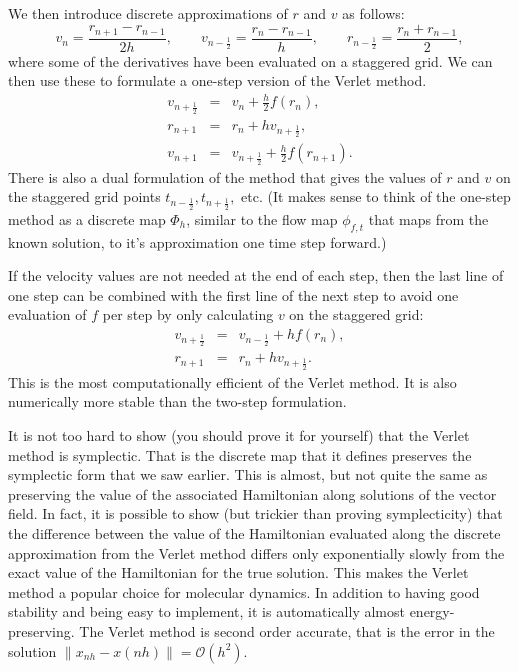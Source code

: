 \documentclass{article}
\begin{document}
We then introduce discrete approximations of $r$ and $v$ as follows:
$$
v_n =\frac{r_{n+1}-r_{n-1}}{2h},\qquad v_{n-\frac12} = \frac{r_n-r_{n-1}}{h}, \qquad r_{n-\frac12} = \frac{r_n + r_{n-1}}{2},
$$
where some of the derivatives have been evaluated on a staggered grid. We can then use these to formulate a one-step version of the Verlet method. 
\begin{eqnarray*}
	v_{n+\frac12} &=& v_n+\frac{h}{2}f(r_n),\\
	r_{n+1} &=& r_n +hv_{n+\frac12},\\
	v_{n+1} &=& v_{n+\frac12}+\frac{h}{2}f(r_{n+1}).
\end{eqnarray*}
There is also a dual formulation of the method that gives the values of $r$ and $v$ on the staggered grid points $t_{n-\frac12},t_{n+\frac12},$ etc.
(It makes sense to think of the one-step method as a discrete map $\Phi_h$, similar to the flow map $\phi_{f,t}$ that maps from the known solution, to it's approximation one time step forward.)

If the velocity values are not needed at the end of each step, then the last line of one step can be combined with the first line of the next step to avoid one evaluation of $f$ per step by only calculating $v$ on the staggered grid:
\begin{eqnarray*}
	v_{n+\frac12} &=& v_{n-\frac12}+hf(r_n),\\
	r_{n+1} &=& r_n +hv_{n+\frac12}.
\end{eqnarray*}
This is the most computationally efficient of the Verlet method. It is also numerically more stable than the two-step formulation.

It is not too hard to show (you should prove it for yourself) that the Verlet method is symplectic. That is the discrete map that it defines preserves the symplectic form that we saw earlier. This is almost, but not quite the same as preserving the value of the associated Hamiltonian along solutions of the vector field. In fact, it is possible to show (but trickier than proving symplecticity) that the difference between the value of the Hamiltonian evaluated along the discrete approximation from the Verlet method differs only exponentially slowly from the exact value of the Hamiltonian for the true solution. This makes the Verlet method a popular choice for molecular dynamics. In addition to having good stability and being easy to implement, it is automatically almost energy-preserving. The Verlet method is second order accurate, that is the error in the solution $\|x_{nh}-x(nh)\|=\mathcal{O}(h^2)$.
\end{document}
